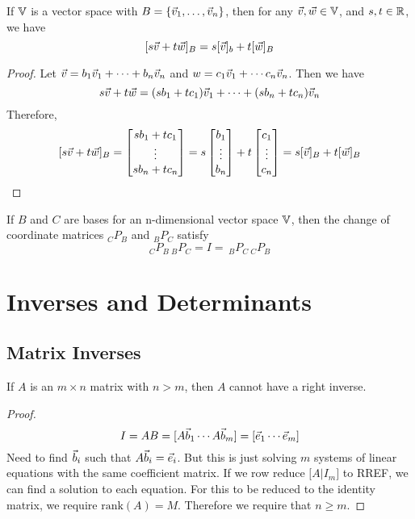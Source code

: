 \documentclass[english,12pt]{article}
\begin{document}
\begin{thrm}
If ${\mathbb{V}}$ is a vector space with $B = \{\vec{v}_1,\dots,\vec{v}_n\}$, then for any $\vec{v},\vec{w} \in {\mathbb{V}}$, and $s,t \in {\mathbb{R}}$, we have
\[\lbrack s \vec{v} + t \vec{w} \rbrack_B = s \lbrack \vec{v} \rbrack_b + t \lbrack \vec{w} \rbrack_B\]
\begin{proof}
Let $\vec{v} = b_1 \vec{v}_1 + \cdots + b_n \vec{v}_n$ and $w = c_1 \vec{v}_1 + \cdots c_n \vec{v}_n$. Then we have
\[s\vec{v} + t \vec{w} = (sb_1 + tc_1) \vec{v}_1 + \cdots + (sb_n + tc_n) \vec{v}_n\]
Therefore,
\[\lbrack s \vec{v} + t \vec{w} \rbrack_B = \begin{bmatrix} sb_1 + tc_1 \\ \vdots \\ sb_n + tc_n \end{bmatrix} = s \begin{bmatrix} b_1 \\ \vdots \\b_n \end{bmatrix} + t \begin{bmatrix} c_1 \\ \vdots \\c_n \end{bmatrix} = s \lbrack \vec{v} \rbrack_B + t \lbrack \vec{w} \rbrack_B\]
\end{proof}
\end{thrm}

\begin{thrm}
If $B$ and $C$ are bases for an n-dimensional vector space ${\mathbb{V}}$, then the change of coordinate matrices $_CP_B$ and $_BP_C$ satisfy
\[_CP_B\,_BP_C = I = \,_BP_C\,_CP_B\]
\end{thrm}

\section{Inverses and Determinants}

\subsection{Matrix Inverses}

\begin{thrm}
If $A$ is an $m \times n$ matrix with $n > m$, then $A$ cannot have a right inverse.
\begin{proof}
\[ I = AB = \lbrack A\vec{b}_1 \cdots A\vec{b}_m \rbrack = \lbrack \vec{e}_1 \cdots \vec{e}_m \rbrack\]
Need to find $\vec{b}_i$ such that $A\vec{b}_i = \vec{e}_i$. But this is just solving $m$ systems of linear equations with the same coefficient matrix. If we row reduce $\lbrack A | I_m \rbrack$ to RREF, we can find a solution to each equation. For this to be reduced to the identity matrix, we require $\text{rank}(A) = M$. Therefore we require that $n \geq m$.
\end{proof}
\end{thrm}
\end{document}
